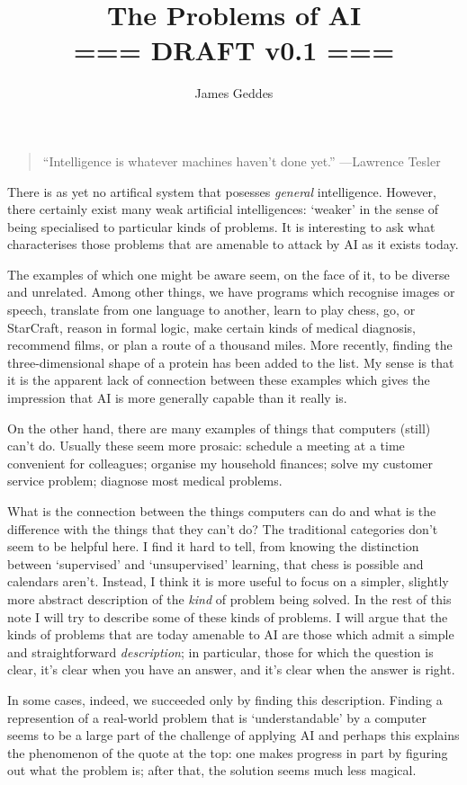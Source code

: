 \documentclass[10pt, a4paper, twocolumn]{article}
\title{The Problems of AI \\ === DRAFT v0.1 ===}
\author{James Geddes}
\begin{document}
\maketitle
\thispagestyle{empty}\pagestyle{empty}
\begin{quote}
``Intelligence is whatever machines haven't done yet.'' ---Lawrence Tesler
\end{quote}
There is as yet no artifical system that posesses \emph{general}
intelligence. However, there certainly exist many weak artificial intelligences:
`weaker' in the sense of being specialised to particular kinds of problems. It
is interesting to ask what characterises those problems that are amenable to
attack by AI as it exists today.

The examples of which one might be aware seem, on the face of it, to be diverse
and unrelated. Among other things, we have programs which recognise images or
speech, translate from one language to another, learn to play chess, go, or
StarCraft, reason in formal logic, make certain kinds of medical diagnosis,
recommend films, or plan a route of a thousand miles. More recently, finding the
three-dimensional shape of a protein has been added to the list. My sense is
that it is the apparent lack of connection between these examples which gives
the impression that AI is more generally capable than it really is.

On the other hand, there are many examples of things that computers (still)
can't do. Usually these seem more prosaic: schedule a meeting at a time
convenient for colleagues; organise my household finances; solve my customer
service problem; diagnose most medical problems.

What is the connection between the things computers can do and what is the
difference with the things that they can't do? The traditional categories don't
seem to be helpful here. I find it hard to tell, from knowing the distinction
between `supervised' and `unsupervised' learning, that chess is possible and
calendars aren't. Instead, I think it is more useful to focus on a simpler,
slightly more abstract description of the \emph{kind} of problem being
solved. In the rest of this note I will try to describe some of these kinds of
problems. I will argue that the kinds of problems that are today amenable to AI
are those which admit a simple and straightforward \emph{description}; in
particular, those for which the question is clear, it's clear when you have an
answer, and it's clear when the answer is right.

In some cases, indeed, we succeeded only by finding this description. Finding a
represention of a real-world problem that is `understandable' by a computer
seems to be a large part of the challenge of applying AI and perhaps this
explains the phenomenon of the quote at the top: one makes progress in part by
figuring out what the problem is; after that, the solution seems much less
magical.
\end{document}

